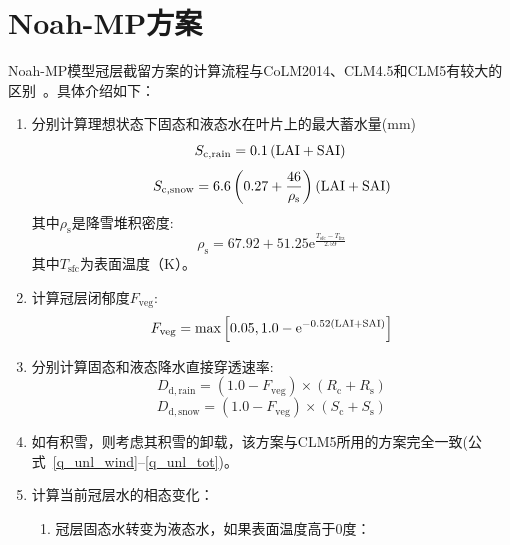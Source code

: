 \section{Noah-MP方案}
Noah-MP模型冠层截留方案的计算流程与CoLM2014、CLM4.5和CLM5有较大的区别~\citep{niu2011community,he2023modernizing}。具体介绍如下：
\begin{enumerate}
  \item 分别计算理想状态下固态和液态水在叶片上的最大蓄水量(mm)\\
    \begin{equation}
      S_{\mathrm{c,rain}}=0.1\left({\rm LAI}+{\rm SAI}\right)\\
    \end{equation}
    \begin{equation}
      S_{\mathrm{c,snow}}= 6.6\left(0.27+{\frac{46}{\rho_{\mathrm{s}}}}\right) \left({\rm LAI}+{\rm SAI}\right)
    \end{equation}
    其中$\rho_{\mathrm{s}}$是降雪堆积密度:
    \begin{equation}
      \rho_{\mathrm{s}}=67.92+51.25 {\mathrm e}^{\frac{T_{\mathrm{sfc}}-T_{\mathrm{frz}}}{2.59}}
    \end{equation}
其中$T_{\mathrm{sfc}}$为表面温度（K）。
  \item 计算冠层闭郁度$F_{\mathrm{veg}}$:
    \begin{equation}
      F_{\mathrm{veg}} = \max\left[0.05,1.0-{\mathrm e}^{-0.52\left({\rm LAI}+{\rm SAI}\right)}\right]
    \end{equation}
  \item 分别计算固态和液态降水直接穿透速率:
    \begin{equation}
      D_{\mathrm{d,rain}}=\left(1.0-F_{\mathrm{veg}}\right) \times (R_{\mathrm{c}}+R_{\mathrm{s}})
    \end{equation}
    \begin{equation}
      D_{\mathrm{d,snow}}=\left(1.0-F_{\mathrm{veg}}\right) \times (S_{\mathrm{c}}+S_{\mathrm{s}})
    \end{equation}
  \item 如有积雪，则考虑其积雪的卸载，该方案与CLM5所用的方案完全一致(公式~\eqref{q_unl_wind}--\eqref{q_unl_tot})。
  \item 计算当前冠层水的相态变化：
    \begin{enumerate}
      \item 冠层固态水转变为液态水，如果表面温度高于0度：
        \begin{equation}
          \begin{aligned}

\end{aligned}
\end{equation}
\end{enumerate}
\end{enumerate}
